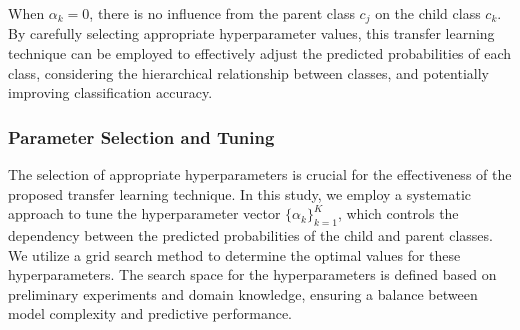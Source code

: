 \documentclass[review,1p,times,numbers]{elsarticle}
\begin{document}
When $\alpha_k=0 $, there is no influence from the parent class $c_j$ on the child class $c_k$.  By carefully selecting appropriate hyperparameter values, this transfer learning technique can be employed to effectively adjust the predicted probabilities of each class, considering the hierarchical relationship between classes, and potentially improving classification accuracy.

\subsubsection{Parameter Selection and Tuning}
The selection of appropriate hyperparameters is crucial for the effectiveness of the proposed transfer learning technique. In this study, we employ a systematic approach to tune the hyperparameter vector ${\{\alpha_k \}}_{k=1}^K$, which controls the dependency between the predicted probabilities of the child and parent classes. We utilize a grid search method to determine the optimal values for these hyperparameters. The search space for the hyperparameters is defined based on preliminary experiments and domain knowledge, ensuring a balance between model complexity and predictive performance.
\end{document}
